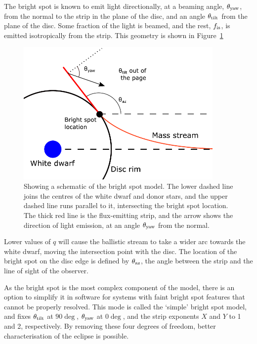 The bright spot is known to emit light directionally, at a beaming angle, $\theta_{\rm yaw}$, from the normal to the strip in the plane of the disc, and an angle $\theta_{\rm tilt}$ from the plane of the disc. 
Some fraction of the light is beamed, and the rest, $f_{\rm is}$, is emitted isotropically from the strip. This geometry is shown in Figure~\ref{fig:modelling:bright spot schematic}
\begin{figure}
    \centering
    \includegraphics[width=0.9\textwidth]{figures/modelling/bright_spot_schematic.pdf}
    \caption{Showing a schematic of the bright spot model. The lower dashed line joins the centres of the white dwarf and donor stars, and the upper dashed line runs parallel to it, intersecting the bright spot location. The thick red line is the flux-emitting strip, and the arrow shows the direction of light emission, at an angle $\theta_{\rm yaw}$ from the normal.}
    \label{fig:modelling:bright spot schematic}
\end{figure}

Lower values of $q$ will cause the ballistic stream to take a wider arc towards the white dwarf, moving the intersection point with the disc. The location of the bright spot on the disc edge is defined by $\theta_{\rm az}$, the angle between the strip and the line of sight of the observer.

As the bright spot is the most complex component of the model, there is an option to simplify it in software for systems with faint bright spot features that cannot be properly resolved.
This mode is called the `simple' bright spot model, and fixes $\theta_{\rm tilt}$ at $90\deg$, $\theta_{\rm yaw}$ at $0\deg$, and the strip exponents $X$ and $Y$ to 1 and 2, respectively. By removing these four degrees of freedom, better characterisation of the eclipse is possible.


